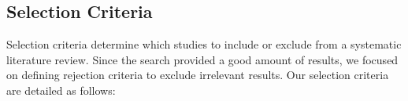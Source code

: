 \subsection{Selection Criteria}

Selection criteria determine which studies to include or exclude from a systematic literature review. 
Since the search provided a good amount of results, we focused on defining rejection criteria to exclude irrelevant results.
Our selection criteria are detailed as follows:




